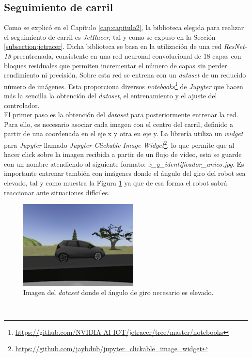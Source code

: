 \subsection{Seguimiento de carril}
\label{subsection:lanefollower}
Como se explicó en el Capítulo \ref{cap:capitulo2}, la biblioteca elegida para realizar el seguimiento de carril es \textit{JetRacer}, tal y como se expuso en la Sección \ref{subsection:jetracer}. Dicha biblioteca se basa en la utilización de una red \textit{ResNet-18} preentrenada, consistente en una red neuronal convolucional de 18 capas con bloques residuales que permiten incrementar el número de capas sin perder rendimiento ni precisión. Sobre esta red se entrena con un \textit{dataset} de un reducido número de imágenes. Esta proporciona diversos \textit{notebooks}\footnote{\url{https://github.com/NVIDIA-AI-IOT/jetracer/tree/master/notebooks}} de \textit{Jupyter} que hacen más la sencilla la obtención del \textit{dataset}, el entrenamiento y el ajuste del controlador.\\

El primer paso es la obtención del \textit{dataset} para posteriormente entrenar la red. Para ello, es necesario asociar cada imagen con el centro del carril, definido a partir de una coordenada en el eje x y otra en eje y. La librería utiliza un \textit{widget} para \textit{Jupyter} llamado \textit{Jupyter Clickable Image Widget}\footnote{\url{https://github.com/jaybdub/jupyter_clickable_image_widget}}, lo que permite que al hacer click sobre la imagen recibida a partir de un flujo de vídeo, esta se guarde con un nombre atendiendo al siguiente formato: \textit{x\_y\_identificador\_unico.jpg}. Es importante entrenar también con imágenes donde el ángulo del giro del robot sea elevado, tal y como muestra la Figura \ref{fig:traineddifficult} ya que de esa forma el robot sabrá reaccionar ante situaciones difíciles.\\

\begin{figure} [h!]
	\begin{center}
		\includegraphics[width=6cm]{figs/trainedDifficult}
	\end{center}
	\caption{Imagen del \textit{dataset} donde el ángulo de giro necesario es elevado.}
	\label{fig:traineddifficult}
\end{figure}\

